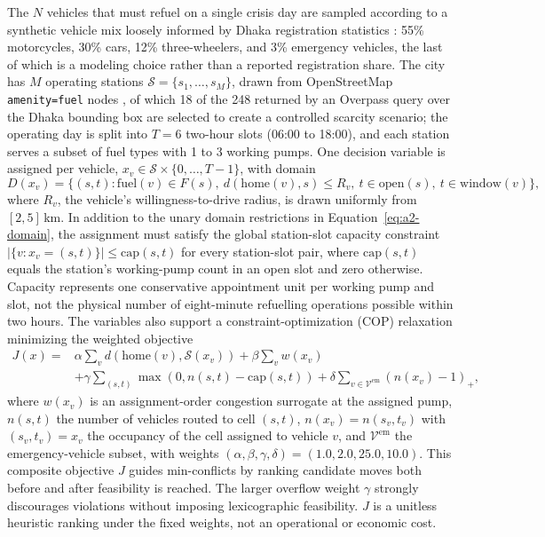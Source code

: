 \documentclass{ai-lab-report}
\begin{document}
The $N$ vehicles that must refuel on a single crisis day are sampled according to a synthetic vehicle mix loosely informed by Dhaka registration statistics \citep{brta2024registered,tbsvehiclemix2026}: 55\% motorcycles, 30\% cars, 12\% three-wheelers, and 3\% emergency vehicles, the last of which is a modeling choice rather than a reported registration share. The city has $M$ operating stations $\mathcal{S}=\{s_1,\dots,s_M\}$, drawn from OpenStreetMap \texttt{amenity=fuel} nodes \citep{osmWikiFuel}, of which 18 of the 248 returned by an Overpass query over the Dhaka bounding box are selected to create a controlled scarcity scenario; the operating day is split into $T=6$ two-hour slots (06:00 to 18:00), and each station serves a subset of fuel types with 1 to 3 working pumps. One decision variable is assigned per vehicle, $x_v \in \mathcal{S}\times\{0,\dots,T-1\}$, with domain
\begin{equation}
D(x_v) = \big\{(s,t) : \mathrm{fuel}(v)\in F(s),\ d(\mathrm{home}(v),s)\le R_v,\ t\in\mathrm{open}(s),\ t\in\mathrm{window}(v)\big\},
\label{eq:a2-domain}
\end{equation}
where $R_v$, the vehicle's willingness-to-drive radius, is drawn uniformly from $[2,5]$\,km. In addition to the unary domain restrictions in Equation~\eqref{eq:a2-domain}, the assignment must satisfy the global station-slot capacity constraint $\big|\{v : x_v=(s,t)\}\big| \le \mathrm{cap}(s,t)$ for every station-slot pair, where $\mathrm{cap}(s,t)$ equals the station's working-pump count in an open slot and zero otherwise. Capacity represents one conservative appointment unit per working pump and slot, not the physical number of eight-minute refuelling operations possible within two hours. The variables also support a constraint-optimization (COP) relaxation minimizing the weighted objective
\begin{equation}
\begin{split}
J(x)={}&\alpha\sum_v d(\mathrm{home}(v),\mathcal{S}(x_v)) + \beta\sum_v w(x_v)\\
&+ \gamma\sum_{(s,t)}\max(0,n(s,t)-\mathrm{cap}(s,t)) + \delta\sum_{v\in\mathcal{V}^{\text{em}}}(n(x_v)-1)_+,
\end{split}
\label{eq:a2-cop}
\end{equation}
where $w(x_v)$ is an assignment-order congestion surrogate at the assigned pump, $n(s,t)$ the number of vehicles routed to cell $(s,t)$, $n(x_v)=n(s_v,t_v)$ with $(s_v,t_v)=x_v$ the occupancy of the cell assigned to vehicle $v$, and $\mathcal{V}^{\text{em}}$ the emergency-vehicle subset, with weights $(\alpha,\beta,\gamma,\delta)=(1.0,2.0,25.0,10.0)$. This composite objective $J$ guides min-conflicts by ranking candidate moves both before and after feasibility is reached. The larger overflow weight $\gamma$ strongly discourages violations without imposing lexicographic feasibility. $J$ is a unitless heuristic ranking under the fixed weights, not an operational or economic cost.
\end{document}
